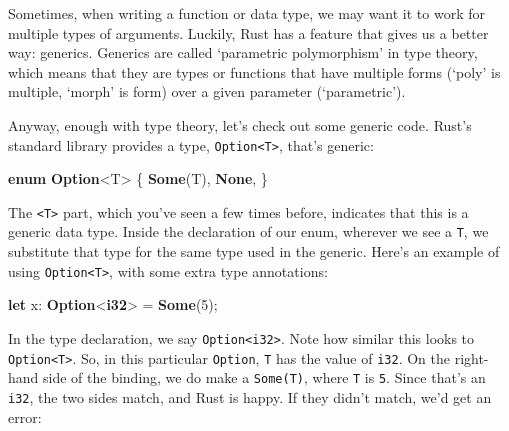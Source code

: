 \documentclass[a4paper,]{book}
\newenvironment{Shaded}{\begin{snugshade}}{\end{snugshade}}
\newcommand{\KeywordTok}[1]{\textcolor[rgb]{0.13,0.29,0.53}{\textbf{{#1}}}}
\newcommand{\DecValTok}[1]{\textcolor[rgb]{0.00,0.00,0.81}{{#1}}}
\newcommand{\NormalTok}[1]{{#1}}
\begin{document}

Sometimes, when writing a function or data type, we may want it to work
for multiple types of arguments. Luckily, Rust has a feature that gives
us a better way: generics. Generics are called `parametric polymorphism'
in type theory, which means that they are types or functions that have
multiple forms (`poly' is multiple, `morph' is form) over a given
parameter (`parametric').

Anyway, enough with type theory, let's check out some generic code.
Rust's standard library provides a type,
\texttt{Option\textless{}T\textgreater{}}, that's generic:

\begin{Shaded}
\begin{Highlighting}[]
\KeywordTok{enum} \KeywordTok{Option}\NormalTok{<T> \{}
    \KeywordTok{Some}\NormalTok{(T),}
    \KeywordTok{None}\NormalTok{,}
\NormalTok{\}}
\end{Highlighting}
\end{Shaded}

The \texttt{\textless{}T\textgreater{}} part, which you've seen a few
times before, indicates that this is a generic data type. Inside the
declaration of our enum, wherever we see a \texttt{T}, we substitute
that type for the same type used in the generic. Here's an example of
using \texttt{Option\textless{}T\textgreater{}}, with some extra type
annotations:

\begin{Shaded}
\begin{Highlighting}[]
\KeywordTok{let} \NormalTok{x: }\KeywordTok{Option}\NormalTok{<}\KeywordTok{i32}\NormalTok{> = }\KeywordTok{Some}\NormalTok{(}\DecValTok{5}\NormalTok{);}
\end{Highlighting}
\end{Shaded}

In the type declaration, we say
\texttt{Option\textless{}i32\textgreater{}}. Note how similar this looks
to \texttt{Option\textless{}T\textgreater{}}. So, in this particular
\texttt{Option}, \texttt{T} has the value of \texttt{i32}. On the
right-hand side of the binding, we do make a \texttt{Some(T)}, where
\texttt{T} is \texttt{5}. Since that's an \texttt{i32}, the two sides
match, and Rust is happy. If they didn't match, we'd get an error:
\end{document}
